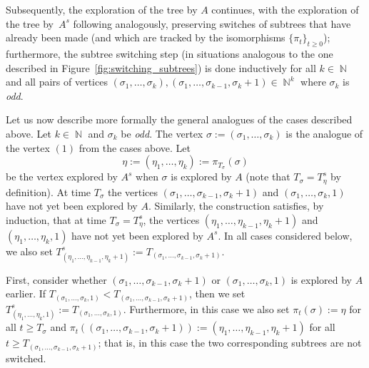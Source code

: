 \documentclass[11pt]{article}
\numberwithin{equation}{section}
\DeclareMathOperator{\N}{\mathbb{N}} %
\theoremstyle{definition}
\begin{document}
Subsequently, the exploration of the tree by $A$ continues, with the exploration of the tree by~$A^{s}$ following analogously, preserving switches of subtrees that have already been made 
(and which are tracked by the isomorphisms $\{\pi_{t}\}_{t \geq 0}$); 
furthermore,
the subtree switching step (in situations analogous to the one described in Figure~\ref{fig:switching_subtrees}) is done inductively for all $k \in \N$ and all pairs of vertices 
$(\sigma_{1}, \ldots, \sigma_{k}), (\sigma_{1}, \ldots, \sigma_{k-1}, \sigma_{k} + 1) \in \N^{k}$ 
where $\sigma_{k}$ is \emph{odd}. 

Let us now describe more formally the general analogues of the cases described above. 
Let $k \in \N$ and $\sigma_{k}$ be \emph{odd}. 
The vertex $\sigma := (\sigma_{1}, \ldots, \sigma_{k})$ is the analogue of the vertex $(1)$ from the cases above. 
Let 
\[
\eta := \left( \eta_{1}, \ldots, \eta_{k} \right) := \pi_{T_{\sigma}} \left( \sigma \right)
\]
be the vertex explored by $A^{s}$ when $\sigma$ is explored by $A$ (note that $T_{\sigma} = T_{\eta}^{s}$ by definition).
At time $T_{\sigma}$ the vertices 
$(\sigma_{1}, \ldots, \sigma_{k-1}, \sigma_{k} + 1)$ 
and $(\sigma_{1}, \dots, \sigma_{k}, 1)$ 
have not yet been explored by $A$. 
Similarly, the construction satisfies, by induction, 
that at time $T_{\sigma} = T_{\eta}^{s}$, the vertices 
$(\eta_{1}, \ldots, \eta_{k-1}, \eta_{k} + 1)$ 
and $(\eta_{1}, \dots, \eta_{k}, 1)$ 
have not yet been explored by $A^{s}$. 
In all cases considered below, we also set 
$T^{s}_{(\eta_{1}, \ldots, \eta_{k-1}, \eta_{k} + 1)} := T_{(\sigma_{1}, \ldots, \sigma_{k-1}, \sigma_{k} + 1)}$.

First, consider whether 
$(\sigma_{1}, \ldots, \sigma_{k-1}, \sigma_{k} + 1)$ 
or 
$(\sigma_{1}, \dots, \sigma_{k}, 1)$ 
is explored by $A$ earlier. 
If 
$T_{(\sigma_{1}, \dots, \sigma_{k}, 1)} < T_{(\sigma_{1}, \ldots, \sigma_{k-1}, \sigma_{k} + 1)}$, 
then we set 
$T^{s}_{(\eta_{1}, \dots, \eta_{k}, 1)} := T_{(\sigma_{1}, \dots, \sigma_{k}, 1)}$. 
Furthermore, in this case we also set 
$\pi_{t} \left( \sigma \right) := \eta$ 
for all $t \geq T_{\sigma}$ 
and $\pi_{t} \left( (\sigma_{1}, \ldots, \sigma_{k-1}, \sigma_{k} + 1) \right) := (\eta_{1}, \ldots, \eta_{k-1}, \eta_{k} + 1)$ 
for all $t \geq T_{(\sigma_{1}, \ldots, \sigma_{k-1}, \sigma_{k} + 1)}$; 
that is, in this case the two corresponding subtrees are not switched. 
\end{document}
